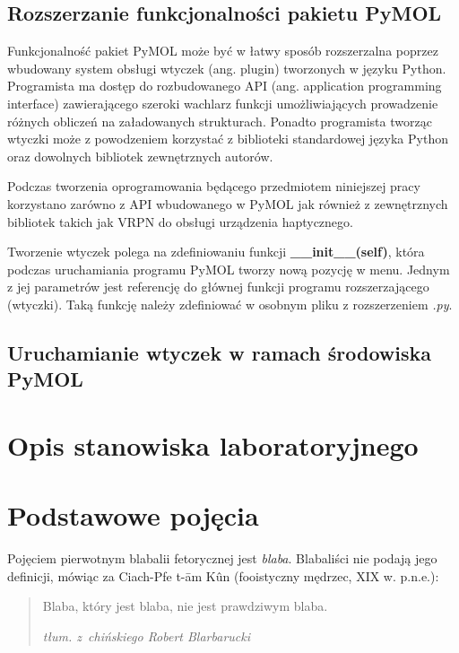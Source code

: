 \documentclass[licencjacka]{pracamgr}
\begin{document}
\section{Rozszerzanie funkcjonalności pakietu PyMOL}
Funkcjonalność pakiet PyMOL może być w łatwy sposób rozszerzalna poprzez wbudowany system obsługi wtyczek (ang. plugin) tworzonych w języku Python. Programista ma dostęp do rozbudowanego API (ang. application programming interface) zawierającego szeroki wachlarz funkcji umożliwiających prowadzenie różnych obliczeń na załadowanych strukturach. Ponadto programista tworząc wtyczki może z powodzeniem korzystać z biblioteki standardowej języka Python oraz dowolnych bibliotek zewnętrznych autorów.

Podczas tworzenia oprogramowania będącego przedmiotem niniejszej pracy korzystano zarówno z API wbudowanego w PyMOL jak również z zewnętrznych bibliotek takich jak VRPN do obsługi urządzenia haptycznego.

Tworzenie wtyczek polega na zdefiniowaniu funkcji \textbf{\_\_init\_\_(self)}, która podczas uruchamiania programu PyMOL tworzy nową pozycję w menu. Jednym z jej parametrów jest referencję do głównej funkcji programu rozszerzającego (wtyczki). Taką funkcję należy zdefiniować w osobnym pliku z rozszerzeniem \textit{.py}.

\section{Uruchamianie wtyczek w ramach środowiska PyMOL}

\chapter{Opis stanowiska laboratoryjnego}



\iffalse
\chapter{Podstawowe pojęcia}\label{r:pojecia}

Pojęciem pierwotnym blabalii fetorycznej jest \emph{blaba}.
Blabaliści nie podają jego definicji, mówiąc za Ciach-Pfe t-\=am
K\^un (fooistyczny mędrzec, XIX w. p.n.e.):
\begin{quote}
  Blaba, który jest blaba, nie jest prawdziwym blaba.

\raggedleft\slshape tłum. z~chińskiego Robert Blarbarucki
\end{quote}
\end{document}
